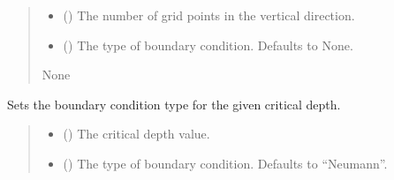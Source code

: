 \documentclass[a4paper,11pt,english,openany]{sphinxmanual}
\begin{document}
\begin{fulllineitems}
\begin{fulllineitems}
\begin{quote}
\begin{description}
\begin{itemize}
\item {} 
\sphinxAtStartPar
{} () \textendash{} The number of grid points in the vertical direction.

\item {} 
\sphinxAtStartPar
{} (\sphinxstyleliteralemphasis{\sphinxupquote{, }}) \textendash{} The type of boundary condition. Defaults to None.

\end{itemize}

\sphinxAtStartPar
None

\end{description}\end{quote}

\end{fulllineitems}


\begin{fulllineitems}
\label{\detokenize{api/spyice.preprocess.modify_initial_boundary:src.spyice.preprocess.modify_initial_boundary.ModifyInitialBoundary.set_boundary_condition_type}}
\pysigstartsignatures
\pysiglinewithargsret
{}
{\sphinxparamcomma {}}
{}
\pysigstopsignatures
\sphinxAtStartPar
Sets the boundary condition type for the given critical depth.
\begin{quote}\begin{description}
\begin{itemize}
\item {} 
\sphinxAtStartPar
{} () \textendash{} The critical depth value.

\item {} 
\sphinxAtStartPar
{} (\sphinxstyleliteralemphasis{\sphinxupquote{, }}) \textendash{} The type of boundary condition. Defaults to “Neumann”.


\end{itemize}
\end{description}
\end{quote}
\end{fulllineitems}
\end{fulllineitems}
\end{document}
